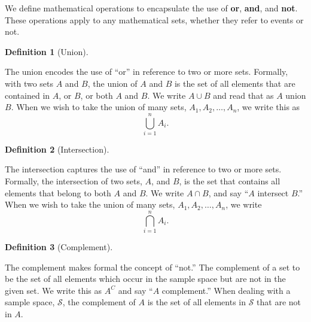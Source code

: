 \documentclass[
  letterpaper,
  DIV=11,
  numbers=noendperiod]{scrreprt}
\theoremstyle{definition}
\newtheorem{definition}{Definition}[chapter]
\theoremstyle{definition}
\theoremstyle{definition}
\theoremstyle{remark}
\begin{document}
We define mathematical operations to encapsulate the use of \textbf{or},
\textbf{and}, and \textbf{not}. These operations apply to any
mathematical sets, whether they refer to events or not.

\begin{definition}[Union]\protect\hypertarget{def-union}{}\label{def-union}

The union encodes the use of ``or'' in reference to two or more sets.
Formally, with two sets \(A\) and \(B\), the union of \(A\) and \(B\) is
the set of all elements that are contained in \(A\), or \(B\), or both
\(A\) and \(B\). We write \(A \cup B\) and read that as \(A\) union
\(B\). When we wish to take the union of many sets,
\(A_1,A_2,\dots,A_n\), we write this as \[\bigcup_{i=1}^n A_i.\]

\end{definition}

\begin{definition}[Intersection]\protect\hypertarget{def-intersection}{}\label{def-intersection}

The intersection captures the use of ``and'' in reference to two or more
sets. Formally, the intersection of two sets, \(A\), and \(B\), is the
set that contains all elements that belong to both \(A\) and \(B\). We
write \(A \cap B\), and say ``\(A\) intersect \(B\).'' When we wish to
take the union of many sets, \(A_1,A_2,\dots,A_n\), we write
\[\bigcap_{i=1}^n A_i.\]

\end{definition}

\begin{definition}[Complement]\protect\hypertarget{def-complement}{}\label{def-complement}

The complement makes formal the concept of ``not.'' The complement of a
set to be the set of all elements which occur in the sample space but
are not in the given set. We write this as \(A^C\) and say ``\(A\)
complement.'' When dealing with a sample space, \(\mathcal{S}\), the
complement of \(A\) is the set of all elements in \(\mathcal{S}\) that
are not in \(A\).

\end{definition}
\end{document}
